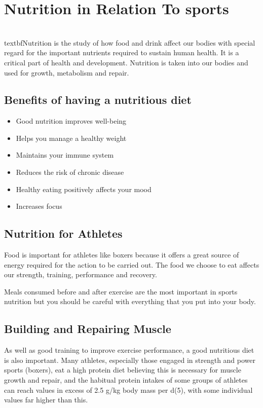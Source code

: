 \documentclass[a4paper,12pt]{report}
\begin{document}
\section{Nutrition in Relation To sports}
\\textbf{Nutrition} is the study of how food and drink affect our bodies with special regard for the important nutrients required to sustain human health. It is a critical part of health and development. Nutrition is taken into our bodies and used for growth, metabolism and repair.

\subsection{Benefits of having a nutritious diet}
\begin{itemize}
    \item Good nutrition improves well-being 
    \item Helps you manage a healthy weight
    \item Maintains your immune system
    \item Reduces the risk of chronic disease
    \item Healthy eating positively affects your mood
    \item Increases focus
\end{itemize}

\subsection{Nutrition for Athletes}
Food is important for athletes like boxers because it offers a great source of energy required for the action to be carried out. The food we choose to eat affects our strength, training, performance and recovery.

Meals consumed before and after exercise are the most important in sports nutrition but you should be careful with everything that you put into your body.  \cite{Nutrition}

\subsection{Building and Repairing Muscle}
As well as good training to improve exercise performance, a good nutritious diet is also important. Many athletes, especially those engaged in strength and power sports (boxers), eat a high protein diet believing this is necessary for muscle growth and repair, and the habitual protein intakes of some groups of athletes can reach values in excess of 2.5 g/kg body mass per d(5), with some individual values far higher than this. \cite{maughan2012nutrition}
\end{document}
